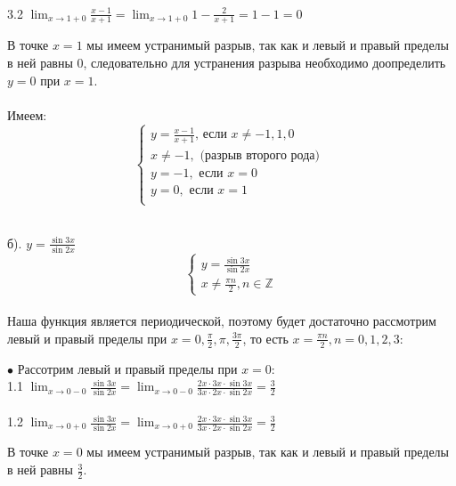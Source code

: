 \documentclass[a4paper, 12pt]{article}
\begin{document}
    \\ 3.2 $\lim_{x \to 1 + 0} \frac{x - 1}{x + 1} = \lim_{x \to 1 + 0} 1 - \frac{2}{x + 1} = 1 - 1 = 0$
    \par В точке $x = 1$ мы имеем устранимый разрыв, так как и левый и правый пределы в ней равны 0, следовательно для устранения разрыва необходимо доопределить $y = 0$ при $x = 1$.
    \\
    \\ Имеем:
    \begin{equation*}
        \begin{cases}
            y = \frac{x - 1}{x + 1} \text{, если } x \neq -1, 1, 0\\
            x \neq -1, \text{ (разрыв второго рода) }\\
            y = -1, \text{ если } x = 0 \\
            y = 0, \text{ если } x = 1 \\
        \end{cases}
    \end{equation*}
    \\
    \par б). $y = \frac{\sin 3x}{\sin 2x}$
    \begin{equation*}
        \begin{cases}
            y = \frac{\sin 3x}{\sin 2x} \\
            x \neq \frac{\pi n}{2}, n \in \mathbb{Z}
        \end{cases}
    \end{equation*}
    \\ Наша функция является периодической, поэтому будет достаточно рассмотрим левый и правый пределы при $x = 0, \frac{\pi}{2}, \pi, \frac{3\pi}{2}$, то есть $x = \frac{\pi n}{2}, n = 0, 1, 2, 3$:
    \\
    \par $\bullet$ Рассотрим левый и правый пределы при $x = 0$:
    \\ 1.1 $\lim_{x \to 0 - 0} \frac{\sin 3x}{\sin 2x} = \lim_{x \to 0 - 0} \frac{2x \cdot 3x \cdot \sin 3x}{3x \cdot 2x \cdot \sin 2x} = \frac{3}{2}$
    \\
    \\ 1.2 $\lim_{x \to 0 + 0} \frac{\sin 3x}{\sin 2x} = \lim_{x \to 0 + 0} \frac{2x \cdot 3x \cdot \sin 3x}{3x \cdot 2x \cdot \sin 2x} = \frac{3}{2}$
    \par В точке $x = 0$ мы имеем устранимый разрыв, так как и левый и правый пределы в ней равны $\frac{3}{2}$.
    \\
\end{document}
